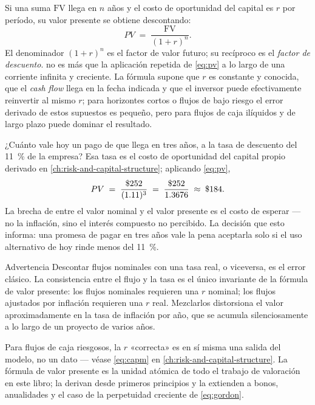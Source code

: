 Si una suma \(\mathrm{FV}\) llega en \(n\) años y el costo de oportunidad del capital es \(r\)
por período, su valor presente se obtiene descontando:
\begin{equation}\label{eq:pv}
  PV \;=\; \frac{\mathrm{FV}}{(1+r)^{n}}.
\end{equation}
El denominador \((1+r)^{n}\) es el factor de valor futuro; su recíproco es el
\emph{factor de descuento}.  no es más que la aplicación repetida de \cref{eq:pv}
a lo largo de una corriente infinita y creciente. La fórmula supone que \(r\) es constante y
conocida, que el \emph{cash flow} llega en la fecha indicada y que el inversor puede
efectivamente reinvertir al mismo \(r\); para horizontes cortos o flujos de bajo riesgo el error
derivado de estos supuestos es pequeño, pero para flujos de caja ilíquidos y de largo plazo
puede dominar el resultado.

\begin{example}
¿Cuánto vale hoy un pago de  que llega en tres años, a la tasa de descuento del
\qty{11}{\percent} de la empresa? Esa tasa es el costo de oportunidad del capital propio derivado
en \cref{ch:risk-and-capital-structure}; aplicando \cref{eq:pv},
\[
  PV \;=\; \frac{\$\num{252}}{(1.11)^{3}}
      \;=\; \frac{\$\num{252}}{1.3676}
      \;\approx\; \$\num{184}.
\]
La brecha de  entre el valor nominal y el valor presente es el costo de esperar ---
no la inflación, sino el interés compuesto no percibido. La decisión que esto informa: una
promesa de pagar  en tres años vale la pena aceptarla solo si el uso alternativo de
 hoy rinde menos del \qty{11}{\percent}.
\end{example}

\begin{admonition}{Advertencia}
Descontar flujos nominales con una tasa real, o viceversa, es el error clásico. La consistencia
entre el flujo y la tasa es el único invariante de la fórmula de valor presente: los flujos
nominales requieren una \(r\) nominal; los flujos ajustados por inflación requieren una \(r\)
real. Mezclarlos distorsiona el valor aproximadamente en la tasa de inflación por año, que se
acumula silenciosamente a lo largo de un proyecto de varios años.
\end{admonition}

Para flujos de caja riesgosos, la \(r\) «correcta» es en sí misma una salida del modelo, no un
dato --- véase \cref{eq:capm} en \cref{ch:risk-and-capital-structure}. La fórmula de valor
presente es la unidad atómica de todo el trabajo de valoración en este libro; \textcite{brealey2020}
la derivan desde primeros principios y la extienden a bonos, anualidades y el caso de la
perpetuidad creciente de \cref{eq:gordon}.

